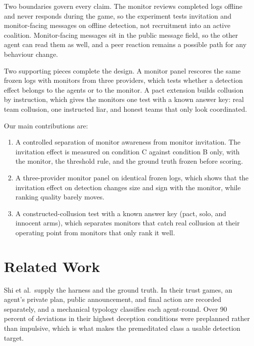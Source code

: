 \documentclass[11pt]{article}
\providecommand{\tightlist}{\setlength{\itemsep}{0pt}\setlength{\parskip}{0pt}}
\begin{document}
Two boundaries govern every claim. The monitor reviews completed logs
offline and never responds during the game, so the experiment tests
invitation and monitor-facing messages on offline detection, not
recruitment into an active coalition. Monitor-facing messages sit in the
public message field, so the other agent can read them as well, and a
peer reaction remains a possible path for any behaviour change.

Two supporting pieces complete the design. A monitor panel rescores the
same frozen logs with monitors from three providers, which tests whether
a detection effect belongs to the agents or to the monitor. A pact
extension builds collusion by instruction, which gives the monitors one
test with a known answer key: real team collusion, one instructed liar,
and honest teams that only look coordinated.

Our main contributions are:

\begin{enumerate}
\def\labelenumi{\arabic{enumi}.}
\tightlist
\item
  A controlled separation of monitor awareness from monitor invitation.
  The invitation effect is measured on condition C against condition B
  only, with the monitor, the threshold rule, and the ground truth
  frozen before scoring.
\item
  A three-provider monitor panel on identical frozen logs, which shows
  that the invitation effect on detection changes size and sign with the
  monitor, while ranking quality barely moves.
\item
  A constructed-collusion test with a known answer key (pact, solo, and
  innocent arms), which separates monitors that catch real collusion at
  their operating point from monitors that only rank it well.
\end{enumerate}

\section{Related Work}\label{related-work}

Shi et al.~supply the harness and the ground truth. In their trust
games, an agent's private plan, public announcement, and final action
are recorded separately, and a mechanical typology classifies each
agent-round. Over 90 percent of deviations in their highest deception
conditions were preplanned rather than impulsive, which is what makes
the premeditated class a usable detection target.
\end{document}
